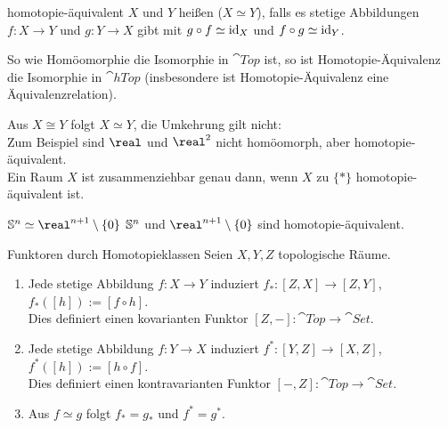 \linie
\pagebreak

\begin{Def}{homotopie-äquivalent}
    $X$ und $Y$ heißen  ($X \simeq Y$),
    falls es stetige Abbildungen $f\colon X \rightarrow Y$ und
    $g\colon Y \rightarrow X$ gibt mit $g \circ f \simeq \operatorname{id}_X$ und
    $f \circ g \simeq \operatorname{id}_Y$.
\end{Def}

\begin{Bem}
    So wie Homöomorphie die Isomorphie in $\cat{Top}$ ist, so ist
    Homotopie-Äquivalenz die Isomorphie in $\cat{hTop}$
    (insbesondere ist Homotopie-Äquivalenz eine Äquivalenzrelation).
\end{Bem}

\begin{Bsp}
    Aus $X \cong Y$ folgt $X \simeq Y$, die Umkehrung gilt nicht: \\
    Zum Beispiel sind $\real$ und $\real^2$ nicht homöomorph, aber
    homotopie-äquivalent. \\
    Ein Raum $X$ ist zusammenziehbar genau dann, wenn $X$ zu $\{\ast\}$
    homotopie-äquivalent ist.
\end{Bsp}

\begin{Satz}{$\sphere^n \simeq \real^{n+1} \setminus \{0\}$}
    $\mathbb{S}^n$ und $\real^{n+1} \setminus \{0\}$
    sind homotopie-äquivalent.
\end{Satz}

\begin{Satz}{Funktoren durch Homotopieklassen}
    Seien $X, Y, Z$ topologische Räume.
    \begin{enumerate}
        \item
        Jede stetige Abbildung $f\colon X \rightarrow Y$ induziert
        $f_\ast\colon [Z, X] \rightarrow [Z, Y]$,
        $f_\ast([h]) := [f \circ h]$. \\
        Dies definiert einen kovarianten Funktor
        $[Z, -]\colon \cat{Top} \rightarrow \cat{Set}$.

        \item
        Jede stetige Abbildung $f\colon Y \rightarrow X$ induziert
        $f^\ast\colon [Y, Z] \rightarrow [X, Z]$,
        $f^\ast([h]) := [h \circ f]$. \\
        Dies definiert einen kontravarianten Funktor
        $[-, Z]\colon \cat{Top} \rightarrow \cat{Set}$.

        \item
        Aus $f \simeq g$ folgt $f_\ast = g_\ast$ und $f^\ast = g^\ast$.
    \end{enumerate}
\end{Satz}


